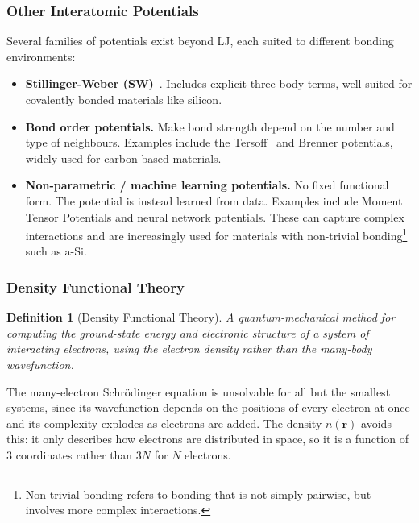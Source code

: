 \documentclass{article}
\newtheorem{definition}{Definition}
\begin{document}
\subsubsection{Other Interatomic Potentials}
Several families of potentials exist beyond LJ, each suited to different bonding environments:
\begin{itemize}
    \item \textbf{Stillinger-Weber (SW)}~\cite{sw1985}. Includes explicit three-body terms, well-suited for covalently bonded materials like silicon.
    \item \textbf{Bond order potentials.} Make bond strength depend on the number and type of neighbours. Examples include the Tersoff~\cite{tersoff1988} and Brenner potentials, widely used for carbon-based materials.
    \item \textbf{Non-parametric / machine learning potentials.} No fixed functional form. The potential is instead learned from data. Examples include Moment Tensor Potentials and neural network potentials. These can capture complex interactions and are increasingly used for materials with non-trivial bonding\footnote{Non-trivial bonding refers to bonding that is not simply pairwise, but involves more complex interactions.} such as a-Si.
\end{itemize}

\subsubsection{Density Functional Theory}
\begin{definition}[Density Functional Theory]
    A quantum-mechanical method for computing the ground-state energy and electronic structure of a system of interacting electrons, using the electron density rather than the many-body wavefunction.
\end{definition}
The many-electron Schr\"odinger equation is unsolvable for all but the smallest systems, since its wavefunction depends on the positions of every electron at once and its complexity explodes as electrons are added. The density $n(\mathbf{r})$ avoids this: it only describes how electrons are distributed in space, so it is a function of 3 coordinates rather than $3N$ for $N$ electrons.
\end{document}
